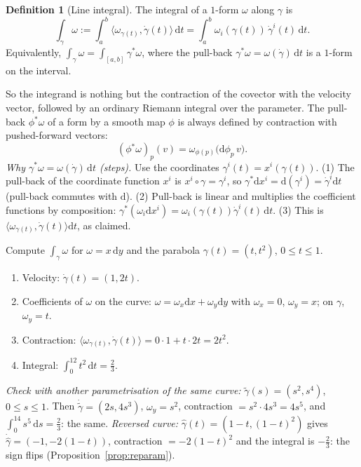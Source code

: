 \documentclass[11pt,a4paper]{article}
\newcounter{thm}[section]
\numberwithin{equation}{section}
\theoremstyle{definition}
\newtheorem{definition}[thm]{Definition}
\theoremstyle{plain}
\newcommand{\dd}{\mathrm{d}}
\newcommand{\pb}{{}^{*}}                            %
\begin{document}
\begin{definition}[Line integral]
The integral of a $1$-form $\omega$ along $\gamma$ is
\begin{equation}\label{eq:lineint}
\int_\gamma\omega:=\int_a^b\bigl\langle\omega_{\gamma(t)},\dot\gamma(t)\bigr\rangle\,\dd t=\int_a^b\omega_i(\gamma(t))\,\dot\gamma^i(t)\,\dd t .
\end{equation}
Equivalently, $\int_\gamma\omega=\int_{[a,b]}\gamma\pb\omega$, where the pull-back $\gamma\pb\omega=\omega(\dot\gamma)\,\dd t$ is a $1$-form on the interval.
\end{definition}

So the integrand is nothing but the contraction of the covector with the velocity vector, followed by an ordinary Riemann integral over the parameter.
The pull-back $\phi\pb\omega$ of a form by a smooth map $\phi$ is always defined by contraction with pushed-forward vectors:
\begin{equation}\label{eq:pullback}
(\phi\pb\omega)_p(v)=\omega_{\phi(p)}\bigl(\dd\phi_p\,v\bigr).
\end{equation}
\emph{Why $\gamma\pb\omega=\omega(\dot\gamma)\,\dd t$ (steps).} Use the coordinates $\gamma^i(t)=x^i(\gamma(t))$. (1) The pull-back of the coordinate function $x^i$ is $x^i\circ\gamma=\gamma^i$, so $\gamma\pb\dd x^i=\dd(\gamma^i)=\dot\gamma^i\dd t$ (pull-back commutes with $\dd$).
(2) Pull-back is linear and multiplies the coefficient functions by composition: $\gamma\pb(\omega_i\dd x^i)=\omega_i(\gamma(t))\dot\gamma^i(t)\,\dd t$. (3) This is $\langle\omega_{\gamma(t)},\dot\gamma(t)\rangle\dd t$, as claimed.

\begin{example}\label{ex:lineint}
Compute $\int_\gamma\omega$ for $\omega=x\,\dd y$ and the parabola $\gamma(t)=(t,t^2)$, $0\le t\le1$.
\begin{enumerate}
\item Velocity: $\dot\gamma(t)=(1,2t)$.
\item Coefficients of $\omega$ on the curve: $\omega=\omega_x\dd x+\omega_y\dd y$ with $\omega_x=0$, $\omega_y=x$; on $\gamma$, $\omega_y=t$.
\item Contraction: $\langle\omega_{\gamma(t)},\dot\gamma(t)\rangle=0\cdot1+t\cdot2t=2t^2$.
\item Integral: $\int_0^12t^2\,\dd t=\frac23$.
\end{enumerate}
\emph{Check with another parametrisation of the same curve:} $\tilde\gamma(s)=(s^2,s^4)$, $0\le s\le1$. Then $\dot{\tilde\gamma}=(2s,4s^3)$, $\omega_y=s^2$, contraction $=s^2\cdot4s^3=4s^5$, and $\int_0^14s^5\,\dd s=\frac23$: the same.
\emph{Reversed curve:} $\hat\gamma(t)=(1-t,(1-t)^2)$ gives $\dot{\hat\gamma}=(-1,-2(1-t))$, contraction $=-2(1-t)^2$ and the integral is $-\frac23$: the sign flips (Proposition~\ref{prop:reparam}).
\end{example}
\end{document}
